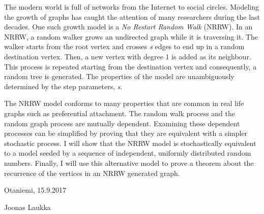\documentclass[finnish, 12pt, a4paper, sci, utf8, pdfa]{aaltothesis}
\begin{document}
\newpage
\begin{abstractpage}[english]
The modern world is full of networks from the Internet to social circles. Modeling the growth
of graphs has caught the attention of many researchers during the last decades. One such growth model
is a \textit{No Restart Random Walk} (NRRW). In an NRRW, a random walker grows
an undirected graph while it is traversing it. The walker starts from the root vertex and crosses \textit{s}
edges to end up in a random destination vertex. Then, a new vertex with degree 1 is added as its neighbour. 
This process is repeated starting from the destination vertex and consequently, a random tree is generated. 
The properties of the model are unambiguously determined by the step parameters, \textit{s}.

The NRRW model conforms to many properties that are common in real life graphs such as
preferential attachment. The random walk process and the random graph process are
mutually dependent. Examining these dependent processes can be simplified by proving that they
are equivalent with a simpler stochastic process. I will show that the NRRW model is stochastically
equivalent to a model seeded by a sequence of independent, uniformly distributed random numbers. Finally, I
will use this alternative model to prove a theorem about the recurrence of the vertices in an NRRW 
generated graph.
\end{abstractpage}

\newpage



\vspace{5cm}
Otaniemi, 15.9.2017

\vspace{5mm}
{\hfill Joonas Laukka \hspace{1cm}}

\newpage
\end{document}

